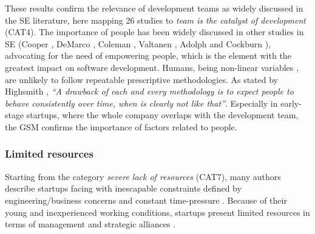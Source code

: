 \documentclass[10pt,journal,letterpaper,compsoc]{IEEEtran}
\begin{document}
These results confirm the relevance of development teams as widely discussed in
the SE literature, here mapping 26 studies to \textit{team is the catalyst of
development} (CAT4). The importance of people has been widely discussed in other
studies in SE (Cooper \cite{Cooper1986}, DeMarco \cite{peopleware-demarco1999},
Coleman \cite{Coleman2004}, Valtanen \cite{Valtanen2008},  Adolph
\cite{Adolph2011} and Cockburn \cite{people-first-order}), advocating for the
need of empowering people, which is the element with the greatest impact on
software development. Humans, being non-linear variables \cite{Human} 
, are unlikely to follow repeatable prescriptive methodologies. As
stated by  Highsmith \cite{Highsmith2000}, \textit{``A drawback of each and
every  methodology is to expect people to behave consistently over time, when is
clearly not like that''}. Especially in early-stage startups, where the whole
company overlaps with the development team, the GSM confirms the importance of
factors related to people.


\subsubsection{Limited resources}

Starting from the category \textit{severe lack of resources} (CAT7), many
authors describe startups facing with inescapable constraints defined by
engineering/business concerns and constant time-pressure \cite{Camel1994a,
Cugola98softwareprocesses:}. Because of their young and inexperienced working
conditions, startups present limited resources in terms of management and
strategic alliances \cite{Sutton2000}.
\end{document}
